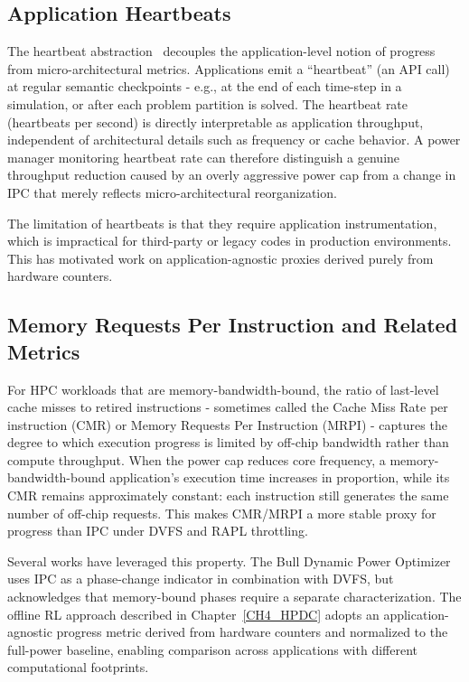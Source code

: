 \subsection{Application Heartbeats}

The heartbeat abstraction~\cite{acar2018heartbeat} decouples the
application-level notion of progress from micro-architectural metrics.
Applications emit a ``heartbeat'' (an API call) at regular semantic
checkpoints - e.g., at the end of each time-step in a simulation, or after each
problem partition is solved.  The heartbeat rate (heartbeats per second) is
directly interpretable as application throughput, independent of architectural
details such as frequency or cache behavior.  A power manager monitoring
heartbeat rate can therefore distinguish a genuine throughput reduction caused by
an overly aggressive power cap from a change in IPC that merely reflects
micro-architectural reorganization.

The limitation of heartbeats is that they require application instrumentation,
which is impractical for third-party or legacy codes in production environments.
This has motivated work on application-agnostic proxies derived purely from
hardware counters.

\subsection{Memory Requests Per Instruction and Related Metrics}

For HPC workloads that are memory-bandwidth-bound, the ratio of last-level cache
misses to retired instructions - sometimes called the Cache Miss Rate per
instruction (CMR) or Memory Requests Per Instruction (MRPI) - captures the
degree to which execution progress is limited by off-chip bandwidth rather than
compute throughput.  When the power cap reduces core frequency, a
memory-bandwidth-bound application's execution time increases in proportion,
while its CMR remains approximately constant: each instruction still generates
the same number of off-chip requests.  This makes CMR/MRPI a more stable proxy
for progress than IPC under DVFS and RAPL throttling.

Several works have leveraged this property.  The Bull Dynamic Power
Optimizer~\cite{8514915} uses IPC as a phase-change indicator in combination
with DVFS, but acknowledges that memory-bound phases require a separate
characterization.  The offline RL approach described in
Chapter~\ref{CH4_HPDC} adopts an application-agnostic progress metric
derived from hardware counters and normalized to the full-power baseline, enabling
comparison across applications with different computational footprints.

